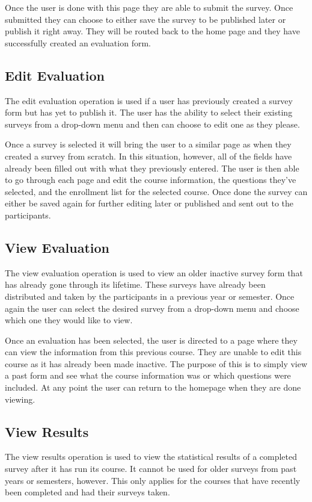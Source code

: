 \documentclass{article}
\begin{document}
Once the user is done with this page they are able to submit the survey. Once submitted they can choose to either save the survey to be published later or publish it right away. They will be routed back to the home page and they have successfully created an evaluation form.

\subsection{Edit Evaluation}
The edit evaluation operation is used if a user has previously created a survey form but has yet to publish it. The user has the ability to select their existing surveys from a drop-down menu and then can choose to edit one as they please.

Once a survey is selected it will bring the user to a similar page as when they created a survey from scratch. In this situation, however, all of the fields have already been filled out with what they previously entered. The user is then able to go through each page and edit the course information, the questions they've selected, and the enrollment list for the selected course. Once done the survey can either be saved again for further editing later or published and sent out to the participants.


\subsection{View Evaluation}
The view evaluation operation is used to view an older inactive survey form that has already gone through its lifetime. These surveys have already been distributed and taken by the participants in a previous year or semester. Once again the user can select the desired survey from a drop-down menu and choose which one they would like to view.

Once an evaluation has been selected, the user is directed to a page where they can view the information from this previous course. They are unable to edit this course as it has already been made inactive. The purpose of this is to simply view a past form and see what the course information was or which questions were included. At any point the user can return to the homepage when they are done viewing.
\subsection{View Results}
The view results operation is used to view the statistical results of a completed survey after it has run its course. It cannot be used for older surveys from past years or semesters, however. This only applies for the courses that have recently been completed and had their surveys taken.
\end{document}
